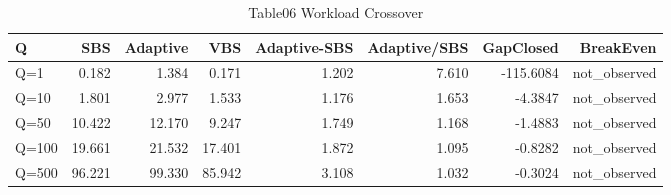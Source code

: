 \begin{table}[htbp]
\centering
\caption{Table06 Workload Crossover}
\begin{tabular}{lrrrrrrr}
\hline
Q & SBS & Adaptive & VBS & Adaptive-SBS & Adaptive/SBS & GapClosed & BreakEven \\
\hline
Q=1 & 0.182 & 1.384 & 0.171 & 1.202 & 7.610 & -115.6084 & not\_observed \\
Q=10 & 1.801 & 2.977 & 1.533 & 1.176 & 1.653 & -4.3847 & not\_observed \\
Q=50 & 10.422 & 12.170 & 9.247 & 1.749 & 1.168 & -1.4883 & not\_observed \\
Q=100 & 19.661 & 21.532 & 17.401 & 1.872 & 1.095 & -0.8282 & not\_observed \\
Q=500 & 96.221 & 99.330 & 85.942 & 3.108 & 1.032 & -0.3024 & not\_observed \\
\hline
\end{tabular}
\end{table}
